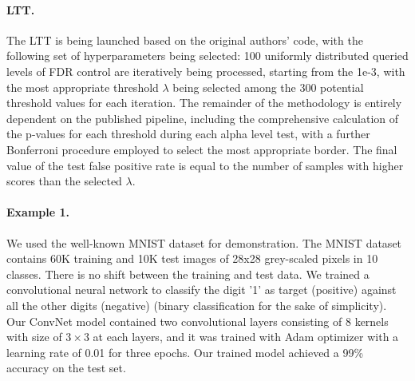 \documentclass{article}
\begin{document}
\paragraph{LTT.} The LTT is being launched based on the original authors' code, with the following set of hyperparameters being selected: 100 uniformly distributed queried levels of FDR control are iteratively being processed, starting from the 1e-3, with the most appropriate threshold $\lambda$ being selected among the 300 potential threshold values for each iteration. The remainder of the methodology is entirely dependent on the published pipeline, including the comprehensive calculation of the p-values for each threshold during each alpha level test, with a further Bonferroni procedure employed to select the most appropriate border. The final value of the test false positive rate is equal to the number of samples with higher scores than the selected $\lambda$. 

\paragraph{Example 	 1.} \label{ex:vanilla} We used the well-known MNIST dataset for demonstration. The MNIST dataset contains 60K training and 10K test images of 28x28 grey-scaled pixels in 10 classes. There is no shift between the training and test data. We trained a convolutional neural network to classify the digit '1' as target (positive) against all the other digits (negative) (binary classification for the sake of simplicity). Our ConvNet model contained two convolutional layers consisting of 8 kernels with size of $3\times3$ at each layers, and it was trained with Adam optimizer with a learning rate of 0.01 for three epochs. Our trained model achieved a 99\% accuracy on the test set. 
\end{document}
